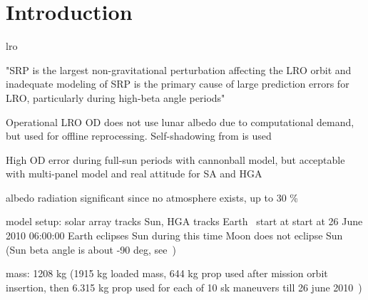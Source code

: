 \section{Introduction}
\gls{lro}

"SRP is the largest non-gravitational perturbation affecting the LRO orbit and inadequate modeling of SRP is the primary cause of large prediction errors for LRO, particularly during high-beta angle periods"~\cite{Slojkowski2015}

Operational LRO OD does not use lunar albedo due to computational demand, but used for offline reprocessing. Self-shadowing from \citeauthor{Mazarico2009} is used~\cite{Nicholson2010}

High OD error during full-sun periods with cannonball model, but acceptable with multi-panel model and real attitude for SA and HGA~\cite[]{Slojkowski2014}

albedo radiation significant since no atmosphere exists, up to 30 \%~\cite{Floberghagen1999}

model setup:
solar array tracks Sun, HGA tracks Earth~\cite{Tooley2010}
start at start at 26 June 2010 06:00:00
Earth eclipses Sun during this time
Moon does not eclipse Sun (Sun beta angle is about -90 deg, see~\cite{Tooley2010})

mass:
1208 kg (1915 kg loaded mass, 644 kg prop used after mission orbit insertion, then 6.315 kg prop used for each of 10 sk maneuvers till 26 june 2010~\cite{Mesarch2010})
